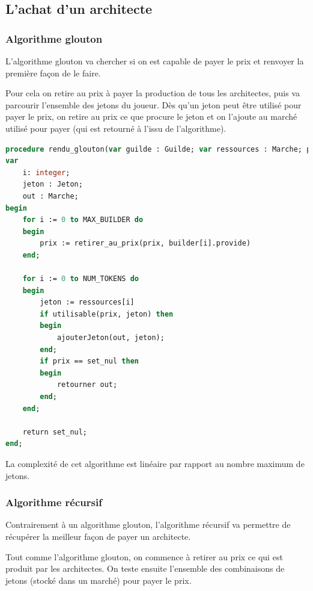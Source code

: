 
\subsection{L'achat d'un architecte}
\label{canbuy}

\subsubsection{Algorithme glouton}

L'algorithme glouton va chercher si on est capable de payer le prix et renvoyer la première façon de le faire.

Pour cela on retire au prix à payer la production de tous les architectes, puis va parcourir l'ensemble des jetons du joueur. Dès qu'un jeton peut être utilisé pour payer le prix, on retire au prix ce que procure le jeton et on l'ajoute au marché utilisé pour payer (qui est retourné à l'issu de l'algorithme).

\begin{lstlisting}[language=pascal, frame=single, caption={Algorithme glouton de rendu de monnaie}]
procedure rendu_glouton(var guilde : Guilde; var ressources : Marche; prix : Set);
var
    i: integer;
    jeton : Jeton;
    out : Marche;
begin
    for i := 0 to MAX_BUILDER do
    begin
        prix := retirer_au_prix(prix, builder[i].provide)
    end;

    for i := 0 to NUM_TOKENS do
    begin
        jeton := ressources[i]
        if utilisable(prix, jeton) then
        begin
            ajouterJeton(out, jeton);
        end;
        if prix == set_nul then
        begin
            retourner out;
        end;
    end;

    return set_nul;
end;

\end{lstlisting}

La complexité de cet algorithme est linéaire par rapport au nombre maximum de jetons. 

\subsubsection{Algorithme récursif}

Contrairement à un algorithme glouton, l'algorithme récursif va permettre de récupérer la meilleur façon de payer un architecte. 

Tout comme l'algorithme glouton, on commence à retirer au prix ce qui est produit par les architectes. On teste ensuite l'ensemble des combinaisons de jetons (stocké dans un marché) pour payer le prix.

